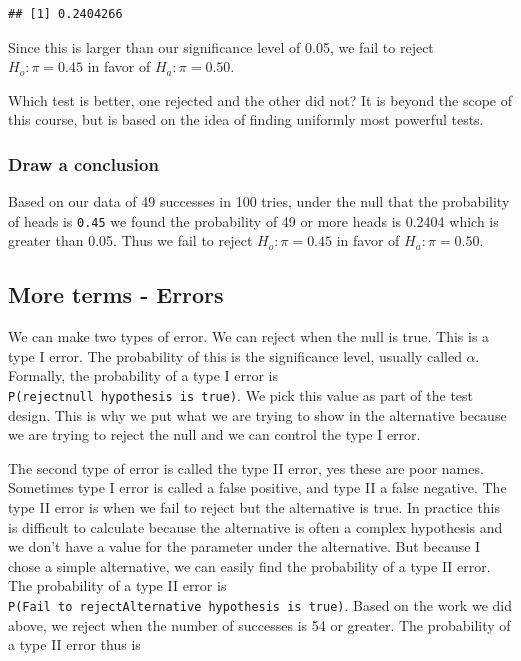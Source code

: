 \documentclass[]{book}
\theoremstyle{definition}
\theoremstyle{definition}
\theoremstyle{definition}
\theoremstyle{remark}
\begin{document}
\begin{verbatim}
## [1] 0.2404266
\end{verbatim}

Since this is larger than our significance level of 0.05, we fail to
reject \(H_{o}: \pi = 0.45\) in favor of \(H_{a}: \pi = 0.50\).

Which test is better, one rejected and the other did not? It is beyond
the scope of this course, but is based on the idea of finding uniformly
most powerful tests.

\subsubsection{Draw a conclusion}\label{draw-a-conclusion}

Based on our data of 49 successes in 100 tries, under the null that the
probability of heads is \texttt{0.45} we found the probability of 49 or
more heads is 0.2404 which is greater than 0.05. Thus we fail to reject
\(H_{o}: \pi = 0.45\) in favor of \(H_{a}: \pi = 0.50\).

\subsection{More terms - Errors}\label{more-terms---errors}

We can make two types of error. We can reject when the null is true.
This is a type I error. The probability of this is the significance
level, usually called \(\alpha\). Formally, the probability of a type I
error is \texttt{P(reject\textbar{}null\ hypothesis\ is\ true)}. We pick
this value as part of the test design. This is why we put what we are
trying to show in the alternative because we are trying to reject the
null and we can control the type I error.

The second type of error is called the type II error, yes these are poor
names. Sometimes type I error is called a false positive, and type II a
false negative. The type II error is when we fail to reject but the
alternative is true. In practice this is difficult to calculate because
the alternative is often a complex hypothesis and we don't have a value
for the parameter under the alternative. But because I chose a simple
alternative, we can easily find the probability of a type II error. The
probability of a type II error is
\texttt{P(Fail\ to\ reject\textbar{}Alternative\ hypothesis\ is\ true)}.
Based on the work we did above, we reject when the number of successes
is 54 or greater. The probability of a type II error thus is
\end{document}
